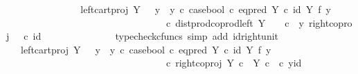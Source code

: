\begin{isabellebody}
\ \ \ \ \ \ \ \ \ \ \isamarkupfalse%
\ \isamarkupfalse%
\ {\isachardoublequoteopen}{\isachardot}{\kern0pt}{\isachardot}{\kern0pt}{\isachardot}{\kern0pt}\ {\isacharequal}{\kern0pt}\ {\isacharparenleft}{\kern0pt}left{\isacharunderscore}{\kern0pt}cart{\isacharunderscore}{\kern0pt}proj\ Y\ {\isasymone}\ {\isasymamalg}\ {\isacharparenleft}{\kern0pt}{\isacharparenleft}{\kern0pt}y{}\ {\isasymamalg}\ y{}{\isacharparenright}{\kern0pt}\ {\isasymcirc}\isactrlsub c\ case{\isacharunderscore}{\kern0pt}bool\ {\isasymcirc}\isactrlsub c\ eq{\isacharunderscore}{\kern0pt}pred\ Y\ {\isasymcirc}\isactrlsub c\ {\isacharparenleft}{\kern0pt}id\ Y\ {\isasymtimes}\isactrlsub f\ y{}{\isacharparenright}{\kern0pt}{\isacharparenright}{\kern0pt}{\isacharparenright}{\kern0pt}\isanewline
\ \ \ \ \ \ \ \ \ \ \ \ \ \ \ \ \ \ \ \ \ \ \ \ \ \ \ \ \ \ \ \ \ {\isasymcirc}\isactrlsub c\ dist{\isacharunderscore}{\kern0pt}prod{\isacharunderscore}{\kern0pt}coprod{\isacharunderscore}{\kern0pt}left\ Y\ {\isasymone}\ {\isasymone}\ \ {\isasymcirc}\isactrlsub c\ \ {\isasymlangle}y{}{\isacharcomma}{\kern0pt}\ right{\isacharunderscore}{\kern0pt}coproj\ {\isasymone}\ {\isasymone}\ {\isasymcirc}\isactrlsub c\ id\ {\isasymone}{\isasymrangle}{\isachardoublequoteclose}\isanewline
\ \ \ \ \ \ \ \ \ \ \ \ \isamarkupfalse%
\ {\isacharparenleft}{\kern0pt}typecheck{\isacharunderscore}{\kern0pt}cfuncs{\isacharcomma}{\kern0pt}\ simp\ add{\isacharcolon}{\kern0pt}\ id{\isacharunderscore}{\kern0pt}right{\isacharunderscore}{\kern0pt}unit{}{\isacharparenright}{\kern0pt}\isanewline
\ \ \ \ \ \ \ \ \ \ \isamarkupfalse%
\ \isamarkupfalse%
\ {\isachardoublequoteopen}{\isachardot}{\kern0pt}{\isachardot}{\kern0pt}{\isachardot}{\kern0pt}\ {\isacharequal}{\kern0pt}\ {\isacharparenleft}{\kern0pt}left{\isacharunderscore}{\kern0pt}cart{\isacharunderscore}{\kern0pt}proj\ Y\ {\isasymone}\ {\isasymamalg}\ {\isacharparenleft}{\kern0pt}{\isacharparenleft}{\kern0pt}y{}\ {\isasymamalg}\ y{}{\isacharparenright}{\kern0pt}\ {\isasymcirc}\isactrlsub c\ case{\isacharunderscore}{\kern0pt}bool\ {\isasymcirc}\isactrlsub c\ eq{\isacharunderscore}{\kern0pt}pred\ Y\ {\isasymcirc}\isactrlsub c\ {\isacharparenleft}{\kern0pt}id\ Y\ {\isasymtimes}\isactrlsub f\ y{}{\isacharparenright}{\kern0pt}{\isacharparenright}{\kern0pt}{\isacharparenright}{\kern0pt}\isanewline
\ \ \ \ \ \ \ \ \ \ \ \ \ \ \ \ \ \ \ \ \ \ \ \ \ \ \ \ \ \ \ \ \ {\isasymcirc}\isactrlsub c\ right{\isacharunderscore}{\kern0pt}coproj\ {\isacharparenleft}{\kern0pt}Y\ {\isasymtimes}\isactrlsub c\ {\isasymone}{\isacharparenright}{\kern0pt}\ {\isacharparenleft}{\kern0pt}Y\ {\isasymtimes}\isactrlsub c\ {\isasymone}{\isacharparenright}{\kern0pt}\ {\isasymcirc}\isactrlsub c\ {\isasymlangle}y{}{\isacharcomma}{\kern0pt}id\ {\isasymone}{\isasymrangle}{\isachardoublequoteclose}\isanewline

\end{isabellebody}
